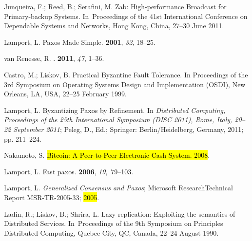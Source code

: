 \documentclass[algorithms,article,accept,moreauthors,pdftex,10pt,a4paper]{Definitions/mdpi}
\begin{document}
\begin{thebibliography}{999}
Junqueira, F.; Reed, B.; Serafini, M.
\newblock Zab: High-performance Broadcast for Primary-backup Systems.
\newblock In~Proceedings of the 41st International Conference on Dependable Systems and Networks, Hong Kong, China, 27--30 June 2011.

Lamport, L.
\newblock Paxos Made Simple.
 {\bf 2001}, {\em 32}, 18--25.

van Renesse, R.
.
 {\bf 2011}, {\em 47}, 1--36.

Castro, M.; Liskov, B.
\newblock Practical Byzantine Fault Tolerance.
\newblock In Proceedings of the 3rd Symposium on Operating Systems Design and Implementation
(OSDI), New Orleans, LA, USA, 22--25 February 1999.

Lamport, L. Byzantizing Paxos by Refinement.
\newblock In {\em Distributed Computing, Proceedings of the 25th International Symposium (DISC
2011), Rome, Italy, 20--22 September 2011}; Peleg, D., Ed.;
Springer: Berlin/Heidelberg, Germany, 2011; pp. 211--224.

Nakamoto, S.
\newblock \hl{Bitcoin: A Peer-to-Peer Electronic Cash System. 2008}. %

Lamport, L.
\newblock Fast paxos.
 {\bf 2006}, {\em 19},~79--103.

Lamport, L.
\newblock \emph{Generalized Consensus and Paxos};
\newblock Microsoft ResearchTechnical Report MSR-TR-2005-33; \hl{2005}. %

Ladin, R.; Liskov, B.; Shrira, L.
\newblock Lazy replication: Exploiting the semantics of Distributed Services.
\newblock In~Proceedings of the 9th Symposium on Principles Distributed Computing, Quebec City, QC, Canada, 22--24 August 1990.



\end{thebibliography}
\end{document}
